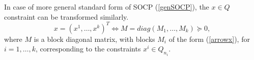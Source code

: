 \documentclass[12pt]{book}
\theoremstyle{definition}
\begin{document}
In case of more general standard form of SOCP (\ref{genSOCP}), the $x\in Q$ constraint 
can be transformed similarly. 
\begin{equation}
x = (x^1,\dots, x^k)^T \Leftrightarrow  M = diag(M_1,\dots, M_k) \succeq 0,
\end{equation}
where $M$ is a block diagonal matrix, with blocks $M_i$ of the form (\ref{arrowx}), for $i=1,\dots, k$,
corresponding to the constraints $x^i\in Q_{n_i}$.

\end{document}

